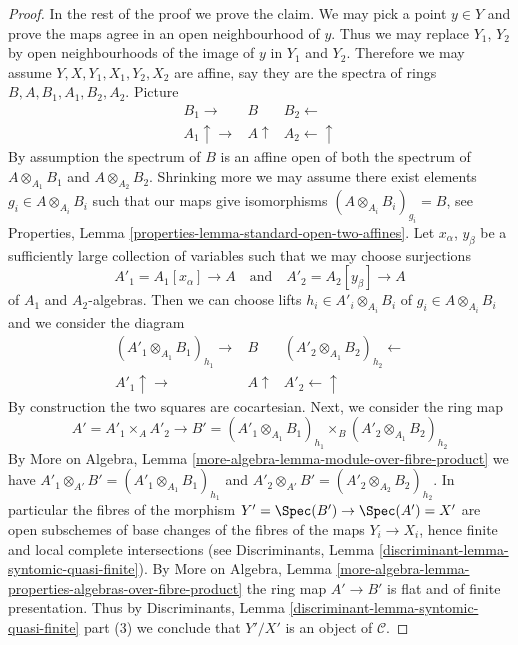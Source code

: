 \begin{proof}
\medskip\noindent
In the rest of the proof we prove the claim. We may pick a point
$y \in Y$ and prove the maps agree in an open neighbourhood of $y$.
Thus we may replace $Y_1$, $Y_2$ by open neighbourhoods of the
image of $y$ in $Y_1$ and $Y_2$. Therefore we may assume
$Y, X, Y_1, X_1, Y_2, X_2$ are affine, say they are the spectra
of rings $B, A, B_1, A_1, B_2, A_2$. Picture
$$
\begin{array}{ccc}B_1 \longrightarrow & B & B_2 \longleftarrow \\ A_1 \uparrow\longrightarrow & A \uparrow & A_2 \longleftarrow\uparrow\end{array}
$$
By assumption the spectrum of $B$ is an affine open of
both the spectrum of $A \otimes_{A_1} B_1$ and $A \otimes_{A_2} B_2$.
Shrinking more we may assume there exist elements
$g_i \in A \otimes_{A_i} B_i$ such that our maps give isomorphisms
$(A \otimes_{A_i} B_i)_{g_i} = B$, see
Properties, Lemma \ref{properties-lemma-standard-open-two-affines}.
Let $x_\alpha$, $y_\beta$ be a sufficiently large collection of
variables such that we may choose surjections
$$
A'_1 = A_1[x_\alpha] \to A
\quad\text{and}\quad
A'_2 = A_2[y_\beta] \to A
$$
of $A_1$ and $A_2$-algebras. Then we can choose lifts
$h_i \in A'_i \otimes_{A_i} B_i$ of $g_i \in A \otimes_{A_i} B_i$
and we consider the diagram
$$
\begin{array}{ccc}(A'_1 \otimes_{A_1} B_1)_{h_1} \longrightarrow & B & (A'_2 \otimes_{A_1} B_2)_{h_2} \longleftarrow \\ A'_1 \uparrow\longrightarrow & A \uparrow & A'_2 \longleftarrow\uparrow\end{array}
$$
By construction the two squares are cocartesian. Next, we consider the
ring map
$$
A' = A'_1 \times_A A'_2 \longrightarrow
B' =
(A'_1 \otimes_{A_1} B_1)_{h_1} \times_B
(A'_2 \otimes_{A_1} B_2)_{h_2}
$$
By
More on Algebra, Lemma \ref{more-algebra-lemma-module-over-fibre-product}
we have $A'_1 \otimes_{A'} B' = (A'_1 \otimes_{A_1} B_1)_{h_1}$
and $A'_2 \otimes_{A'} B' = (A'_2 \otimes_{A_2} B_2)_{h_2}$. In particular
the fibres of the morphism $Y' = \Spec(B') \to \Spec(A') = X'$ are
open subschemes of base changes of the fibres of the maps $Y_i \to X_i$, hence
finite and local complete intersections (see
Discriminants, Lemma \ref{discriminant-lemma-syntomic-quasi-finite}).
By More on Algebra, Lemma
\ref{more-algebra-lemma-properties-algebras-over-fibre-product}
the ring map $A' \to B'$ is flat and of finite presentation.
Thus by Discriminants, Lemma
\ref{discriminant-lemma-syntomic-quasi-finite} part (3)
we conclude that $Y'/X'$ is an object of $\mathcal{C}$.

\end{proof}

